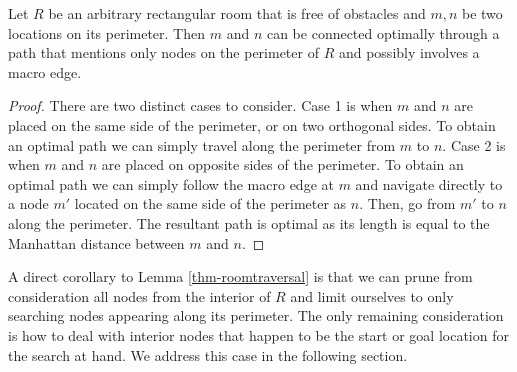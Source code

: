 \begin{lemma}
\label{thm-roomtraversal}
Let $R$ be an arbitrary rectangular room that is free of obstacles
and $m, n$ be two locations on its perimeter.
Then $m$ and $n$ can be connected optimally through a path that
mentions only nodes on the perimeter of $R$ and possibly involves
a macro edge.
\end{lemma}
\begin{proof}
\par
There are two distinct cases to consider.
Case 1 is when $m$ and $n$ are placed on the same side of the perimeter, or
on two orthogonal sides. 
To obtain an optimal path we can simply travel along the perimeter from $m$ to $n$.
Case 2 is when $m$ and $n$ are placed on opposite sides of the perimeter.
To obtain an optimal path we can simply follow the macro edge at $m$ 
and navigate directly to a node $m'$ located on
the same side of the perimeter as $n$. Then, go from $m'$ to $n$ along the perimeter.
The resultant path is optimal as its length is equal to the Manhattan distance between $m$ and $n$.
\end{proof}

A direct corollary to Lemma \ref{thm-roomtraversal} is that we can prune from consideration
all nodes from the interior of $R$ and limit ourselves to only searching nodes appearing along its perimeter. 
The only remaining consideration is how to deal with interior nodes that happen
to be the start or goal location for the search at hand.
We address this case in the following section.
